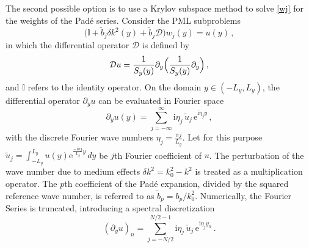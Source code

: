 \documentclass[11pt,a4paper]{article}
\newcommand{\iu}{\mathrm{i}} %
\newcommand{\cD}{\mathcal{D}}
\theoremstyle{plain}%
\theoremstyle{definition}
\theoremstyle{remark}
\begin{document}
The second possible option is to use a Krylov subspace method to solve \eqref{wj} for the weights of the Pad\'e series.
Consider the PML subproblems
\begin{equation} \label{eq:subproblem_pml}
    \bigl(\mathbb{I} + \tilde{b}_j \delta k^2(y) + \tilde{b}_j \cD \bigr) w_j(y) = u(y)\,,
\end{equation}
in which the differential operator $\cD $ is defined by
\begin{equation*}
    \cD u = \frac{1}{S_y(y)} \partial_y \Bigl(\frac{1}{S_y(y)} \partial_y \Bigr) \,,
\end{equation*}
and $\mathbb{I}$ refers to the identity operator.
On the domain $y\in (-L_y, L_y)$, the differential operator $\partial_y u$ can be evaluated in Fourier space
\begin{equation*}
    \partial_y u(y) = 
    \sum_{j=-\infty}^{\infty} \iu \eta_j \,\tilde{u}_j \,\mathrm{e}^{\iu \eta_j y} \,,
\end{equation*}
with the discrete Fourier wave numbers $\eta_j = \frac{\pi j}{L_y}$.
Let for this purpose $\tilde{u}_j = \int_{-L_y}^{L_y} u(y) \mathrm{e}^{\frac{-\iu\pi j}{L_y}y} \,dy$ be $j$th Fourier coefficient of $u$. 
The perturbation of the wave number due to medium effects $\delta k^2 = k_0^2 - k^2$ is treated as a multiplication operator.
The $p$th coefficient of the Pad\'e expansion, divided by the squared reference wave number, is referred to as $\tilde{b}_p = b_p/k_0^2$.
Numerically, the Fourier Series is truncated, introducing a spectral discretization
\begin{equation*}
    (\partial_y u)_n = \sum_{j=-N/2}^{N/2-1} \iu \eta_j \,\tilde{u}_j \,\mathrm{e}^{\iu \eta_j y_n} \,.
\end{equation*}
\end{document}
